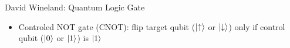 \begin{frame}[t]{David Wineland: Quantum Logic Gate}

  \begin{minipage}[t][4.5cm][t]{\textwidth-1.7cm}
    \begin{itemize}
      \item Controled NOT gate (CNOT): flip target qubit ($\ket{\uparrow}$ or
        $\ket{\downarrow}$) only if control qubit ($\ket{0}$ or $\ket{1}$) is $\ket{1}$
    \end{itemize}  
  \end{minipage}
  \begin{minipage}[t][0.2\textheight][t]{\textwidth}
  \end{minipage}
\end{frame}
